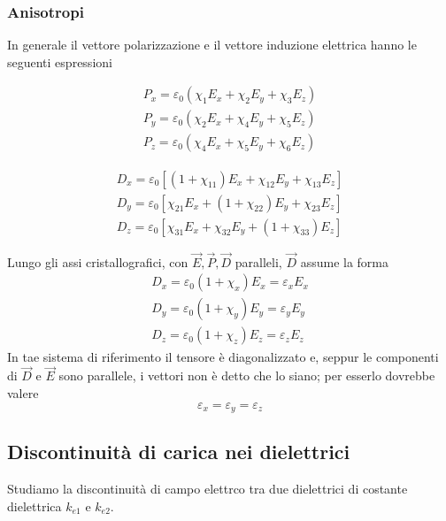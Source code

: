 \documentclass[x11names]{report}
\begin{document}
\subsubsection{Anisotropi}
In generale il vettore polarizzazione e il vettore induzione elettrica hanno le seguenti espressioni
\begin{minipage}{0.5\textwidth}
	\begin{gather*}
		P_x = \varepsilon_0\left(\chi_{1}E_x + \chi_{2}E_y + \chi_{3}E_z \right) \\
		P_y = \varepsilon_0\left(\chi_{2}E_x + \chi_{4}E_y + \chi_{5}E_z \right)\\
		P_z = \varepsilon_0\left(\chi_{4}E_x + \chi_{5}E_y + \chi_{6}E_z \right)
	\end{gather*}
\end{minipage}
\begin{minipage}{0.5\textwidth}
	\begin{gather*}
		D_x = \varepsilon_0\left[(1+\chi_{11})E_x + \chi_{12}E_y + \chi_{13}E_z \right] \\
		D_y = \varepsilon_0\left[\chi_{21}E_x + (1+\chi_{22})E_y + \chi_{23}E_z \right] \\
		D_z = \varepsilon_0\left[\chi_{31}E_x + \chi_{32}E_y + (1+\chi_{33})E_z \right]
	\end{gather*}
\end{minipage}\vspace{0.4cm}
\noindent
Lungo gli assi cristallografici, con \(\vec{E},\vec{P},\vec{D}\) paralleli,  \(\vec{D}\) assume la forma
 \begin{gather*}
	D_x = \varepsilon_0\left(1 + \chi_{x}\right)E_x = \varepsilon_x E_x \\
	D_y = \varepsilon_0\left(1 + \chi_{y}\right)E_y = \varepsilon_y E_y\\
	D_z = \varepsilon_0\left(1 + \chi_{z}\right)E_z = \varepsilon_z E_z
\end{gather*}
In tae sistema di riferimento il tensore è diagonalizzato e, seppur le componenti di \(\vec{D}\) e \(\vec{E}\) sono parallele, i vettori non è detto che lo siano; per esserlo dovrebbe valere
\[
\varepsilon_x = \varepsilon_y = \varepsilon_z 
\]

\subsection{Discontinuità di carica nei dielettrici}
Studiamo la discontinuità di campo elettrco tra due dielettrici di costante dielettrica \(k_{e1}\) e \(k_{e2}\).
\end{document}

